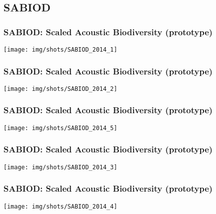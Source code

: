 \documentclass[10pt, final, hyperref, table]{beamer}
\begin{document}
\subsection{SABIOD}
\begin{frame}
  \frametitle{SABIOD: Scaled Acoustic Biodiversity (prototype)}
  \begin{center}
    \texttt{[image: img/shots/SABIOD\_2014\_1]}
  \end{center}
\end{frame}

\begin{frame}
  \frametitle{SABIOD: Scaled Acoustic Biodiversity (prototype)}
  \begin{center}
    \texttt{[image: img/shots/SABIOD\_2014\_2]}
  \end{center}
\end{frame}


\begin{frame}
  \frametitle{SABIOD: Scaled Acoustic Biodiversity (prototype)}
  \begin{center}
    \texttt{[image: img/shots/SABIOD\_2014\_5]}
  \end{center}
\end{frame}


\begin{frame}
  \frametitle{SABIOD: Scaled Acoustic Biodiversity (prototype)}
  \begin{center}
    \texttt{[image: img/shots/SABIOD\_2014\_3]}
  \end{center}
\end{frame}


\begin{frame}
  \frametitle{SABIOD: Scaled Acoustic Biodiversity (prototype)}
  \begin{center}
    \texttt{[image: img/shots/SABIOD\_2014\_4]}
  \end{center}
\end{frame}
\end{document}

